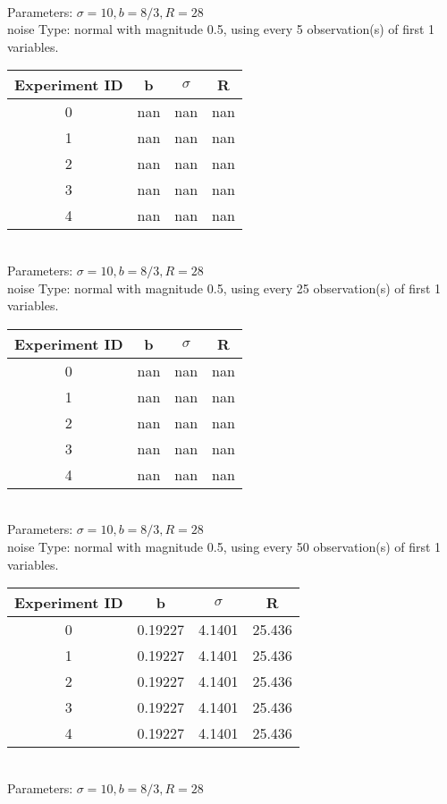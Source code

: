 \begin{multicols}{3}
\begin{tabular}{cccc}
 \end{tabular}\\
Parameters: $\sigma=10, b=8/3, R=28$\\
noise Type: normal with magnitude 0.5, using every 5 observation(s) of first 1 variables.\\
\begin{tabular}{cccc}
\hline Experiment ID & b & $\sigma$ & R \\ \hline 
0 & nan & nan & nan\\ \hline 
 1 & nan & nan & nan\\ \hline 
 2 & nan & nan & nan\\ \hline 
 3 & nan & nan & nan\\ \hline 
 4 & nan & nan & nan\\ \hline 
 \end{tabular}\\
Parameters: $\sigma=10, b=8/3, R=28$\\
noise Type: normal with magnitude 0.5, using every 25 observation(s) of first 1 variables.\\
\begin{tabular}{cccc}
\hline Experiment ID & b & $\sigma$ & R \\ \hline 
0 & nan & nan & nan\\ \hline 
 1 & nan & nan & nan\\ \hline 
 2 & nan & nan & nan\\ \hline 
 3 & nan & nan & nan\\ \hline 
 4 & nan & nan & nan\\ \hline 
 \end{tabular}\\
Parameters: $\sigma=10, b=8/3, R=28$\\
noise Type: normal with magnitude 0.5, using every 50 observation(s) of first 1 variables.\\
\begin{tabular}{cccc}
\hline Experiment ID & b & $\sigma$ & R \\ \hline 
0 & 0.19227 & 4.1401 & 25.436\\ \hline 
 1 & 0.19227 & 4.1401 & 25.436\\ \hline 
 2 & 0.19227 & 4.1401 & 25.436\\ \hline 
 3 & 0.19227 & 4.1401 & 25.436\\ \hline 
 4 & 0.19227 & 4.1401 & 25.436\\ \hline 
 \end{tabular}\\
Parameters: $\sigma=10, b=8/3, R=28$\\

\end{multicols}
